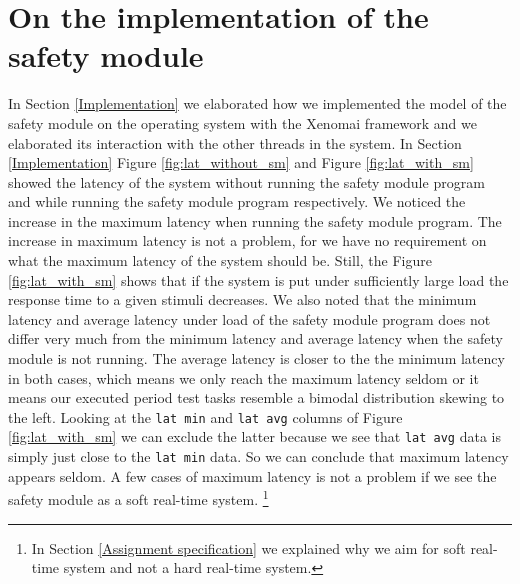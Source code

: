 \documentclass[12pt]{scrreprt}
\begin{document}
\section{On the implementation of the safety module}
\label{On the implementation of the safety module}
In Section \ref{Implementation} we elaborated how we implemented the model of the safety module on the operating system with the Xenomai framework and we elaborated its interaction with the other threads in the system. In Section \ref{Implementation} Figure \ref{fig:lat_without_sm} and Figure \ref{fig:lat_with_sm} showed the latency of the system without running the safety module program and while running the safety module program respectively. We noticed the increase in the maximum latency when running the safety module program. The increase in maximum latency is not a problem, for we have no requirement on what the maximum latency of the system should be. Still, the Figure \ref{fig:lat_with_sm} shows that if the system is put under sufficiently large load the response time to a given stimuli decreases. We also noted that the minimum latency and average latency under load of the safety module program does not differ very much from the minimum latency and average latency when the safety module is not running. The average latency is closer to the the minimum latency in both cases, which means we only reach the maximum latency seldom or it means our executed period test tasks resemble a bimodal distribution skewing to the left. Looking at the \texttt{lat min} and \texttt{lat avg} columns of Figure \ref{fig:lat_with_sm} we can exclude the latter because we see that \texttt{lat avg} data is simply just close to the \texttt{lat min} data. So we can conclude that maximum latency appears seldom. A few cases of maximum latency is not a problem if we see the safety module as a soft real-time system. \footnote{In Section \ref{Assignment specification} we explained why we aim for soft real-time system and not a hard real-time system.}
\par
\end{document}
